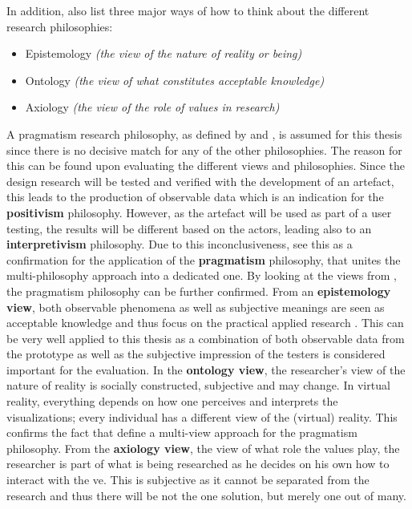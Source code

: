 In addition, \cite{Saunders2009} also list three major ways of how to think about the different research philosophies:
\begin{itemize}[noitemsep,nolistsep]
	\item Epistemology \textit{(the view of the nature of reality or being)}
	\item Ontology \textit{(the view of what constitutes acceptable knowledge)}
	\item Axiology \textit{(the view of the role of values in research)}
\end{itemize}

A pragmatism research philosophy, as defined by \cite{Vaishnavi2008} and \cite{Saunders2009}, is assumed for this thesis since there is no decisive match for any of the other philosophies. The reason for this can be found upon evaluating the different views and philosophies. Since the design research will be tested and verified with the development of an artefact, this leads to the production of observable data which is an indication for the \textbf{positivism} philosophy. However, as the artefact will be used as part of a user testing, the results will be different based on the actors, leading also to an \textbf{interpretivism} philosophy. Due to this inconclusiveness, \cite{Saunders2009} see this as a confirmation for the application of the \textbf{pragmatism} philosophy, that unites the multi-philosophy approach into a dedicated one. \newline
By looking at the views from \cite{Saunders2009}, the pragmatism philosophy can be further confirmed. From an \textbf{epistemology view}, both observable phenomena as well as subjective meanings are seen as acceptable knowledge and thus focus on the practical applied research \citep{Saunders2009}. This can be very well applied to this thesis as a combination of both observable data from the prototype as well as the subjective impression of the testers is considered important for the evaluation. In the \textbf{ontology view}, the researcher's view of the nature of reality is socially constructed, subjective and may change. In virtual reality, everything depends on how one perceives and interprets the visualizations; every individual has a different view of the (virtual) reality. This confirms the fact that \cite{Saunders2009} define a multi-view approach for the pragmatism philosophy. From the \textbf{axiology view}, the view of what role the values play, the researcher is part of what is being researched as he decides on his own how to interact with the \gls{ve}. This is subjective as it cannot be separated from the research and thus there will be not the one solution, but merely one out of many. 



